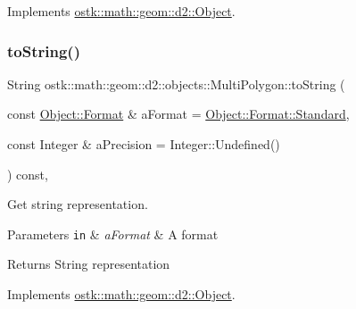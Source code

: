 Implements \hyperlink{classostk_1_1math_1_1geom_1_1d2_1_1_object_ae05ad883ed5a560e38f0aae7a4adc1ea}{ostk\+::math\+::geom\+::d2\+::\+Object}.

\mbox{\label{classostk_1_1math_1_1geom_1_1d2_1_1objects_1_1_multi_polygon_abf52343dc62ec2d62d971bef636f6c1c}} 
\subsubsection{\texorpdfstring{to\+String()}{toString()}}
{\footnotesize\ttfamily String ostk\+::math\+::geom\+::d2\+::objects\+::\+Multi\+Polygon\+::to\+String (\begin{DoxyParamCaption}\item[{const \hyperlink{classostk_1_1math_1_1geom_1_1d2_1_1_object_aa76f9e30caebf4005bafbdff447f66cf}{Object\+::\+Format} \&}]{a\+Format = {\ttfamily \hyperlink{classostk_1_1math_1_1geom_1_1d2_1_1_object_aa76f9e30caebf4005bafbdff447f66cfaeb6d8ae6f20283755b339c0dc273988b}{Object\+::\+Format\+::\+Standard}},  }\item[{const Integer \&}]{a\+Precision = {\ttfamily Integer\+:\+:Undefined()} }\end{DoxyParamCaption}) const\hspace{0.3cm}{\ttfamily [override]}, {\ttfamily [virtual]}}



Get string representation. 


\begin{DoxyParams}[1]{Parameters}
\mbox{\tt in}  & {\em a\+Format} & A format \\
\hline
\end{DoxyParams}
\begin{DoxyReturn}{Returns}
String representation 
\end{DoxyReturn}


Implements \hyperlink{classostk_1_1math_1_1geom_1_1d2_1_1_object_ada4c2187dd24ef02b91b6346191f677c}{ostk\+::math\+::geom\+::d2\+::\+Object}.

\mbox{\label{classostk_1_1math_1_1geom_1_1d2_1_1objects_1_1_multi_polygon_aa80a7642515417486bb846f869120fcd}} 
